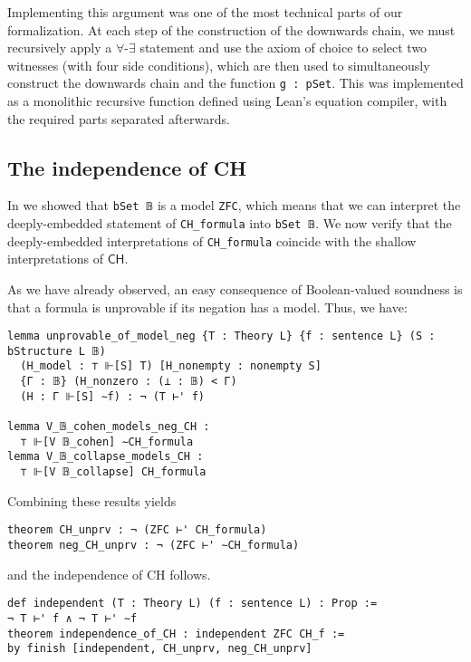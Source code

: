 \documentclass[sigplan,10pt,review, anonymous]{acmart}
\newcommand{\lil}{\lstinline}
\theoremstyle{definition}
\begin{document}
Implementing this argument was one of the most technical parts of our formalization. At each step of the construction of the downwards chain, we must recursively apply a \(\forall\)-\(\exists\) statement and use the axiom of choice to select two witnesses (with four side conditions), which are then used to simultaneously construct the downwards chain and the function \lstinline{g : pSet}. This was implemented as a monolithic recursive function defined using Lean's equation compiler, with the required parts separated afterwards.



\subsection{The independence of CH} \label{subsect:forcing:independence}

In  we showed that \lil{bSet 𝔹} is a model \lil{ZFC},
which means that we can interpret the deeply-embedded statement of \lil{CH_formula} into
\lil{bSet 𝔹}.
We now verify that the deeply-embedded interpretations of \lil{CH_formula} coincide with the shallow interpretations of \(\mathsf{CH}\).

As we have already observed, an easy consequence of Boolean-valued soundness is that a formula is unprovable if its negation has a model. Thus, we have:
\begin{lstlisting}
lemma unprovable_of_model_neg {T : Theory L} {f : sentence L} (S : bStructure L 𝔹)
  (H_model : ⊤ ⊩[S] T) [H_nonempty : nonempty S]
  {Γ : 𝔹} (H_nonzero : (⊥ : 𝔹) < Γ)
  (H : Γ ⊩[S] ∼f) : ¬ (T ⊢' f)

lemma V_𝔹_cohen_models_neg_CH :
  ⊤ ⊩[V 𝔹_cohen] ∼CH_formula
lemma V_𝔹_collapse_models_CH :
  ⊤ ⊩[V 𝔹_collapse] CH_formula
\end{lstlisting}
\noindent Combining these results yields
\begin{lstlisting}
theorem CH_unprv : ¬ (ZFC ⊢' CH_formula)
theorem neg_CH_unprv : ¬ (ZFC ⊢' ∼CH_formula)
\end{lstlisting}
\noindent and the independence of CH follows.
\begin{lstlisting}
def independent (T : Theory L) (f : sentence L) : Prop :=
¬ T ⊢' f ∧ ¬ T ⊢' ∼f
theorem independence_of_CH : independent ZFC CH_f :=
by finish [independent, CH_unprv, neg_CH_unprv]
\end{lstlisting}
\end{document}
